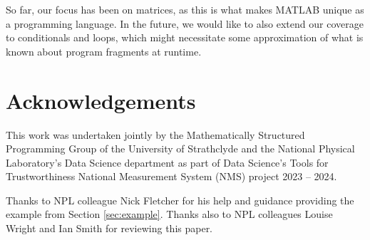 \documentclass{IMEKO2024}
\begin{document}
So far, our focus has been on matrices, as this is what makes MATLAB
unique as a programming language.
%
In the future, we would like to also extend our coverage to
conditionals and loops, which might necessitate some approximation of
what is known about program fragments at runtime.

\section{Acknowledgements}

This work was undertaken jointly by the Mathematically Structured Programming Group of the University of Strathclyde and the National Physical Laboratory’s Data Science department as part of Data Science’s Tools for Trustworthiness National Measurement System (NMS) project 2023 – 2024.

Thanks to NPL colleague Nick Fletcher for his help and guidance providing the example from Section \ref{sec:example}. Thanks also to NPL colleagues Louise Wright and Ian Smith for reviewing this paper.



\end{document}
